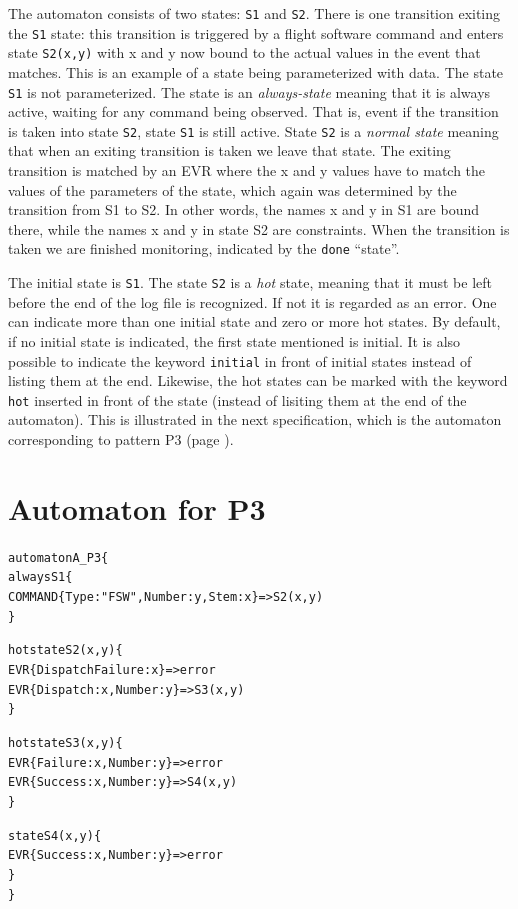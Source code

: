 \documentclass{report}
\newenvironment{code}[1] %
{
\vspace{0.5cm}
\begin{center}
\begin{Sbox}
\begin{minipage}{11cm}
\begin{alltt}
{\bf\em #1}
}
{
\end{alltt}
\end{minipage}
\end{Sbox}
\setlength{\fboxsep}{8pt}
\fbox{\TheSbox}
\end{center}
\vspace{0.5cm}
}
\begin{document}
\noindent The automaton consists of two states: {\tt S1} and {\tt S2}. There is one transition
exiting the {\tt S1} state: this transition is triggered by a flight software command and enters state {\tt S2(x,y)}
with x and y now bound to the actual values in the event that matches. This is an example of a state being
parameterized with data. The state {\tt S1} is not parameterized. The state is an {\em always-state} meaning 
that it is always active, waiting for any command being observed. That is, event if the transition is taken into
state {\tt S2}, state {\tt S1} is still active. State {\tt S2} is a {\em normal state} meaning that when an exiting
transition is taken we leave that state. The exiting transition is matched by an EVR where the x and y values have
to match the values of the parameters of the state, which again was determined by the transition from S1 to S2.
In other words, the names x and y in S1 are bound there, while the names x and y in state S2 are constraints.
When the transition is taken we are finished monitoring, indicated by the {\tt done} ``state''.

The initial state is {\tt S1}. The state {\tt S2} is a {\em hot} state, meaning that it must be left before the end
of the log file is recognized. If not it is regarded as an error. 
One can indicate more than one initial state and
zero or more hot states. By default, if no initial state is indicated, the first state mentioned is initial. It is also possible to indicate the keyword {\tt initial} in front of initial states
instead of listing them at the end.
Likewise, the hot states can be marked with the keyword {\tt hot} inserted in front of the state (instead of lisiting them at the end of the automaton). This is illustrated in the next
specification, which is the automaton corresponding to pattern P3 (page \pageref{pattern:p3}).

\section{Automaton for P3}

\label{automaton:p3}

\begin{code}{}
  automaton A_P3 \{
    always S1 \{
      COMMAND\{Type : "FSW",Number : y,Stem : x\} => S2(x,y)
    \}

    hot state S2(x,y) \{
      EVR\{DispatchFailure : x\} => error
      EVR\{Dispatch : x,Number : y\} => S3(x,y)
    \}

    hot state S3(x,y) \{
      EVR\{Failure : x,Number : y\} => error
      EVR\{Success : x,Number : y\} => S4(x,y)
    \}

    state S4(x,y) \{
      EVR\{Success : x,Number : y\} => error
    \}
  \}
\end{code}
\end{document}
